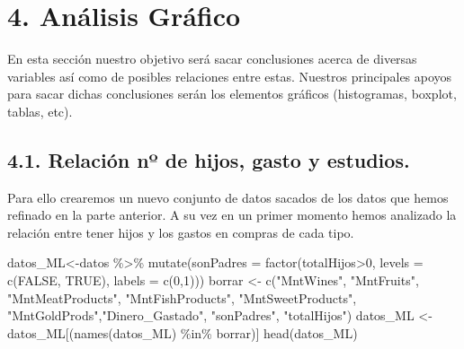 \documentclass[
]{article}
\newenvironment{Shaded}{\begin{snugshade}}{\end{snugshade}}
\newcommand{\AttributeTok}[1]{\textcolor[rgb]{0.77,0.63,0.00}{#1}}
\newcommand{\ConstantTok}[1]{\textcolor[rgb]{0.00,0.00,0.00}{#1}}
\newcommand{\DecValTok}[1]{\textcolor[rgb]{0.00,0.00,0.81}{#1}}
\newcommand{\FunctionTok}[1]{\textcolor[rgb]{0.00,0.00,0.00}{#1}}
\newcommand{\NormalTok}[1]{#1}
\newcommand{\OtherTok}[1]{\textcolor[rgb]{0.56,0.35,0.01}{#1}}
\newcommand{\SpecialCharTok}[1]{\textcolor[rgb]{0.00,0.00,0.00}{#1}}
\newcommand{\StringTok}[1]{\textcolor[rgb]{0.31,0.60,0.02}{#1}}
\begin{document}
\newpage

\hypertarget{anuxe1lisis-gruxe1fico}{%
\section{4. Análisis Gráfico}\label{anuxe1lisis-gruxe1fico}}

En esta sección nuestro objetivo será sacar conclusiones acerca de
diversas variables así como de posibles relaciones entre estas. Nuestros
principales apoyos para sacar dichas conclusiones serán los elementos
gráficos (histogramas, boxplot, tablas, etc).

\hypertarget{relaciuxf3n-nuxba-de-hijos-gasto-y-estudios.}{%
\subsection{4.1. Relación nº de hijos, gasto y
estudios.}\label{relaciuxf3n-nuxba-de-hijos-gasto-y-estudios.}}

Para ello crearemos un nuevo conjunto de datos sacados de los datos que
hemos refinado en la parte anterior. A su vez en un primer momento hemos
analizado la relación entre tener hijos y los gastos en compras de cada
tipo.

\begin{Shaded}
\begin{Highlighting}[]
\NormalTok{datos\_ML}\OtherTok{\textless{}{-}}\NormalTok{datos }\SpecialCharTok{\%\textgreater{}\%}
  \FunctionTok{mutate}\NormalTok{(}\AttributeTok{sonPadres =} \FunctionTok{factor}\NormalTok{(totalHijos}\SpecialCharTok{\textgreater{}}\DecValTok{0}\NormalTok{, }\AttributeTok{levels =} \FunctionTok{c}\NormalTok{(}\ConstantTok{FALSE}\NormalTok{, }\ConstantTok{TRUE}\NormalTok{), }\AttributeTok{labels =} \FunctionTok{c}\NormalTok{(}\DecValTok{0}\NormalTok{,}\DecValTok{1}\NormalTok{)))}
\NormalTok{borrar }\OtherTok{\textless{}{-}} \FunctionTok{c}\NormalTok{(}\StringTok{"MntWines"}\NormalTok{, }\StringTok{"MntFruits"}\NormalTok{, }\StringTok{"MntMeatProducts"}\NormalTok{,}
            \StringTok{"MntFishProducts"}\NormalTok{, }\StringTok{"MntSweetProducts"}\NormalTok{,}
            \StringTok{"MntGoldProds"}\NormalTok{,}\StringTok{"Dinero\_Gastado"}\NormalTok{, }\StringTok{"sonPadres"}\NormalTok{, }\StringTok{"totalHijos"}\NormalTok{)}
\NormalTok{datos\_ML }\OtherTok{\textless{}{-}}\NormalTok{ datos\_ML[(}\FunctionTok{names}\NormalTok{(datos\_ML) }\SpecialCharTok{\%in\%}\NormalTok{ borrar)]}
\FunctionTok{head}\NormalTok{(datos\_ML) }
\end{Highlighting}
\end{Shaded}
\end{document}

